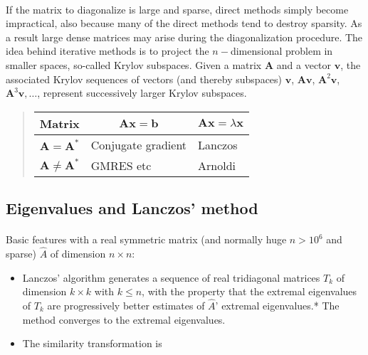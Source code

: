 \paragraph{}
If the matrix to diagonalize is large and sparse, direct methods simply become impractical, 
also because
many of the direct methods tend to destroy sparsity. As a result large dense matrices may arise during the diagonalization procedure.  The idea behind iterative methods is to project the 
$n-$dimensional problem in smaller spaces, so-called Krylov subspaces. 
Given a matrix $\mathbf{A}$ and a vector $\mathbf{v}$, the associated Krylov sequences of vectors
(and thereby subspaces) 
$\mathbf{v}$, $\mathbf{A}\mathbf{v}$, $\mathbf{A}^2\mathbf{v}$, $\mathbf{A}^3\mathbf{v},\dots$, represent
successively larger Krylov subspaces. 


\begin{quote}
\begin{tabular}{lll}
\hline
\multicolumn{1}{c}{ Matrix } & \multicolumn{1}{c}{ $\mathbf{A}\mathbf{x}=\mathbf{b}$ } & \multicolumn{1}{c}{ $\mathbf{A}\mathbf{x}=\lambda\mathbf{x}$ } \\
\hline
$\mathbf{A}=\mathbf{A}^*$    & Conjugate gradient                & Lanczos                                  \\
$\mathbf{A}\ne \mathbf{A}^*$ & GMRES etc                         & Arnoldi                                  \\
\hline
\end{tabular}
\end{quote}

\noindent



\subsection*{Eigenvalues and Lanczos' method}

\paragraph{}
Basic features with a real symmetric matrix (and normally huge $n> 10^6$ and sparse) 
$\hat{A}$ of dimension $n\times n$:

\begin{itemize}
\item Lanczos' algorithm generates a sequence of real tridiagonal matrices $T_k$ of dimension $k\times k$ with $k\le n$, with the property that the extremal eigenvalues of $T_k$ are progressively better estimates of $\hat{A}$' extremal eigenvalues.* The method converges to the extremal eigenvalues.

\item The similarity transformation is 
\end{itemize}

